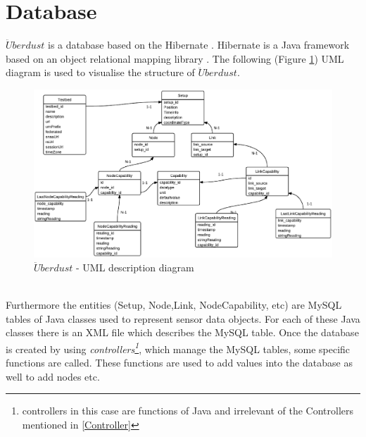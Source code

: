\documentclass[12pt,a4paper,draft]{report}
\begin{document}
\section{Database}
%
$\ddot{U}berdust$ is a database based on the Hibernate \cite{website:hibernate}. Hibernate is a Java framework based on an object relational mapping library \cite{website:hibernate-wiki}. The following (Figure \ref{uberdust-uml}) UML diagram is used to visualise the structure of $\ddot{U}berdust$.
%
\begin{figure}[H]
\centering
\includegraphics*[scale=0.6]{wisedb2}
\caption{$\ddot{U}berdust$ - UML description diagram}
\label{uberdust-uml}
\end{figure}
\ \\
Furthermore the entities (Setup, Node,Link, NodeCapability, etc) are MySQL tables of Java classes used to represent sensor data objects.
For each of these Java classes there is an XML file which describes the MySQL table.
Once the database is created by using \textit{controllers\footnote{controllers in this case are functions of Java and irrelevant of the Controllers mentioned in \ref{Controller}}}, which manage the MySQL tables, some specific functions are called. These functions are used to add values into the database as well to add nodes etc. 
%
\newpage
%
\end{document}
